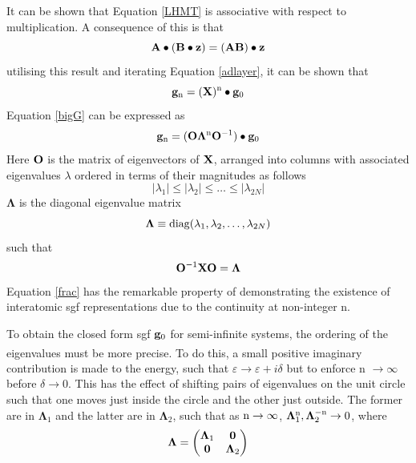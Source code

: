 \documentclass[a4paper, 12pt]{article}
\newcommand{\site}[1]{\textsuperscript{\textcolor{blue}{\cite{#1}}}}
\begin{document}
It can be shown that Equation \eqref{LHMT} is associative with respect to multiplication. A consequence of this is that 
\begin{equation}
\bf A\bullet(B\bullet z) = (AB)\bullet z
\end{equation}
utilising this result and iterating Equation \eqref{adlayer}, it can be shown that
\begin{equation}\label{bigG}
	{\bf g}_{\rm n} = ({\bf X})^{\rm n}\bullet {\bf g}_0
\end{equation}
Equation \eqref{bigG} can be expressed as 
\begin{equation}\label{frac}
	{\bf g}_{\rm n} = ({\bf O}\bm\Lambda^{\rm n}{\bf O}^{-1})\bullet {\bf g}_0
\end{equation}
Here ${\bf O}$ is the matrix of eigenvectors of ${\bf X}$, arranged into columns with associated eigenvalues $\lambda$ ordered in terms of their magnitudes as follows
\begin{equation}
	| {\lambda}_1 | \leq | {\lambda}_2 | \leq \ldots \leq | {\lambda}_{2N} |
\end{equation}
$\bm \Lambda$ is the diagonal eigenvalue matrix
\begin{equation}
	\bm \Lambda \equiv {\rm diag}(\lambda_1,\lambda_2,\dots,\lambda_{2N})
\end{equation}
such that 
	\begin{equation}
		{\bf O}^{-1} {\bf X}{\bf O} = \bm \Lambda
	\end{equation}
	Equation \eqref{frac} has the remarkable property of demonstrating the existence of interatomic \gls{sgf} representations due to the continuity at non-integer n.
	\par To obtain the closed form \gls{sgf} ${\bf g}_0$ for semi-infinite systems, the ordering of the eigenvalues must be more precise\site{rev3}. To do this, a small positive imaginary contribution is made to the energy, such that $\varepsilon \longrightarrow \varepsilon+i\delta$ but to enforce n $\rightarrow \infty$ before $\delta \rightarrow 0$. This has the effect of shifting pairs of eigenvalues on the unit circle such that one moves just inside the circle and the other just outside. The former are in $\bm \Lambda_1$ and the latter are in $\bm \Lambda_2$, such that as $\rm n\rightarrow\infty$, \quad $\bm\Lambda_1^{\rm n}, \bm\Lambda_2^{-\rm n}\rightarrow 0$, where
	\begin{equation}
		\bm \Lambda = \begin{pmatrix} \bm \Lambda_1&\bf 0\\\bf 0&\bm \Lambda_2 \end{pmatrix}
	\end{equation}
\end{document}
